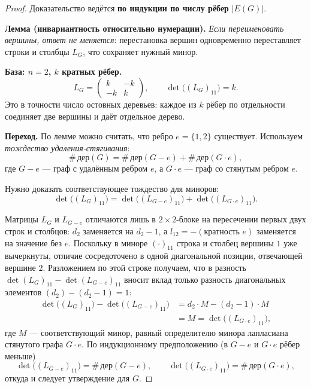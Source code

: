 \begin{proof}
	Доказательство ведётся \textbf{по индукции по числу рёбер} $|E(G)|$.

	\medskip
	\textbf{Лемма (инвариантность относительно нумерации).} \emph{Если переименовать вершины, ответ не меняется}: перестановка вершин одновременно переставляет строки и столбцы $L_G$, что сохраняет нужный минор.

	\medskip
	\textbf{База: $n = 2$, $k$ кратных рёбер.}
	\[
	L_G =
	\begin{pmatrix} k & -k \\ -k & k \end{pmatrix},
	\qquad
	\det\!\bigl((L_G)_{11}\bigr) = k.
	\]
	Это в точности число остовных деревьев: каждое из $k$ рёбер по отдельности соединяет две вершины и даёт отдельное дерево.\checkmark

	\medskip
	\textbf{Переход.} По лемме можно считать, что ребро $e = \{1,2\}$ существует. Используем
	\emph{тождество удаления-стягивания}:
	\[
	\#\,\text{дер}(G) = \#\,\text{дер}(G{-}e) + \#\,\text{дер}(G{\cdot}e),
	\]
	где $G{-}e$ — граф с удалённым ребром $e$, а $G{\cdot}e$ — граф со стянутым ребром $e$.

	Нужно доказать соответствующее тождество для миноров:
	\[
	\det\!\bigl((L_G)_{11}\bigr)
	= \det\!\bigl((L_{G-e})_{11}\bigr) + \det\!\bigl((L_{G\cdot e})_{11}\bigr).
	\]

	Матрицы $L_G$ и $L_{G-e}$ отличаются лишь в $2\times2$-блоке на пересечении первых двух строк и столбцов: $d_2$ заменяется на $d_2{-}1$, а $l_{12}=-(\text{кратность } e)$ заменяется на значение без $e$. Поскольку в миноре $(\cdot)_{11}$ строка и столбец вершины $1$ уже вычеркнуты, отличие сосредоточено в одной диагональной позиции, отвечающей вершине $2$. Разложением по этой строке получаем, что в разность $\det(L_G)_{11} - \det(L_{G-e})_{11}$ вносит вклад только разность диагональных элементов $(d_2) - (d_2{-}1) = 1$:
	\begin{align*}
		\det\!\bigl((L_G)_{11}\bigr) - \det\!\bigl((L_{G-e})_{11}\bigr)
		&= d_2 \cdot M - (d_2{-}1)\cdot M \\
		&= M = \det\!\bigl((L_{G\cdot e})_{11}\bigr),
	\end{align*}
	где $M$ — соответствующий минор, равный определителю минора лапласиана стянутого графа $G\cdot e$. По индукционному предположению (в $G-e$ и $G\cdot e$ рёбер меньше)
	\[
	\det\!\bigl((L_{G-e})_{11}\bigr)=\#\,\text{дер}(G{-}e),\qquad
	\det\!\bigl((L_{G\cdot e})_{11}\bigr)=\#\,\text{дер}(G{\cdot}e),
	\]
	откуда и следует утверждение для $G$.
\end{proof}

